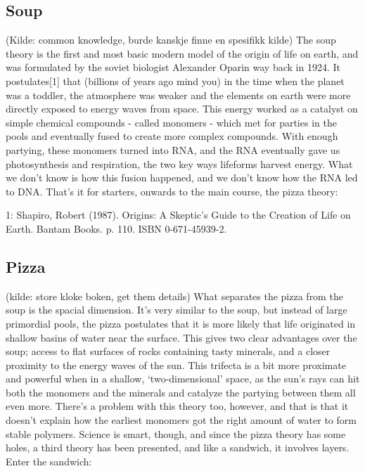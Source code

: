 \subsection{Soup}
(Kilde: common knowledge, burde kanskje finne en spesifikk kilde)
The soup theory is the first and most basic modern model of the origin of life on earth, and was formulated by the soviet biologist Alexander Oparin way back in 1924. It postulates[1] that (billions of years ago mind you) in the time when the planet was a toddler, the atmosphere was weaker and the elements on earth were more directly exposed to energy waves from space. This energy worked as a catalyst on simple chemical compounds - called monomers - which met for parties in the pools and eventually fused to create more complex compounds. With enough partying, these monomers turned into RNA, and the RNA eventually gave us photosynthesis and respiration, the two key ways lifeforms harvest energy. What we don’t know is how this fusion happened, and we don’t know how the RNA led to DNA. That’s it for starters, onwards to the main course, the pizza theory: 

1:  Shapiro, Robert (1987). Origins: A Skeptic's Guide to the Creation of Life on Earth. Bantam Books. p. 110. ISBN 0-671-45939-2.

\subsection{Pizza} (kilde: store kloke boken, get them details)
What separates the pizza from the soup is the spacial dimension. It’s very similar to the soup, but instead of large primordial pools, the pizza postulates that it is more likely that life originated in shallow basins of water near the surface. This gives two clear advantages over the soup; access to flat surfaces of rocks containing tasty minerals, and a closer proximity to the energy waves of the sun. This trifecta is a bit more proximate and powerful when in a shallow, ‘two-dimensional’ space, as the sun’s rays can hit both the monomers and the minerals and catalyze the partying between them all even more. There’s a problem with this theory too, however, and that is that it doesn’t explain how the earliest monomers got the right amount of water to form stable polymers. Science is smart, though, and since the pizza theory has some holes, a third theory has been presented, and like a sandwich, it involves layers. Enter the sandwich:


